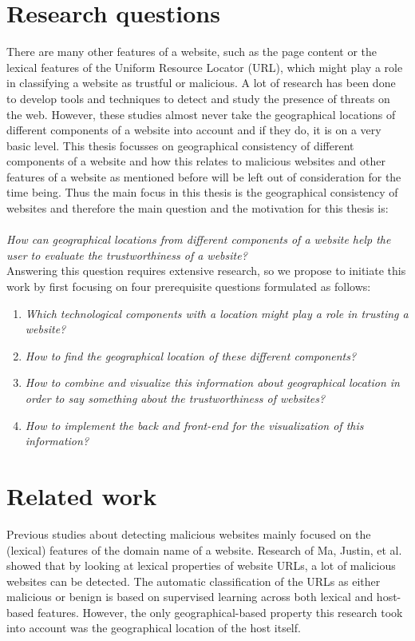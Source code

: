 \documentclass[twoside,openright,notitlepage]{uva-bachelor-thesis}
\begin{document}
\section{Research questions}
There are many other features of a website, such as the page content or the lexical features of the Uniform Resource Locator (URL), which might play a role in classifying a website as trustful or malicious. A lot of research has been done to develop tools and techniques to detect and study the presence of threats on the web. However, these studies almost never take the geographical locations of different components of a website into account and if they do, it is on a very basic level. This thesis focusses on geographical consistency of different components of a website and how this relates to malicious websites and other features of a website as mentioned before will be left out of consideration for the time being. Thus the main focus in this thesis is the geographical consistency of websites and therefore the main question and the motivation for this thesis is:\\\\
\emph{How can geographical locations from different components of a website help the user to evaluate the trustworthiness of a website?}\\

Answering this question requires extensive research, so we propose to initiate this work by first focusing on four prerequisite questions formulated as follows:
\begin{enumerate}
  \item \emph{Which technological components with a location might play a role in trusting a website?}
  \item \emph{How to find the geographical location of these different components?}
  \item \emph{How to combine and visualize this information about geographical location in order to say something about the trustworthiness of websites?}
  \item \emph{How to implement the back and front-end for the visualization of this information?}
\end{enumerate}

\section{Related work}
Previous studies about detecting malicious websites mainly focused on the (lexical) features of the domain name of a website. Research of Ma, Justin, et al.~\cite{ma2009beyond} showed that by looking at lexical properties of website URLs, a lot of malicious websites can be detected. The automatic classification of the URLs as either malicious or benign is based on supervised learning across both lexical and host-based features. However, the only geographical-based property this research took into account was the geographical location of the host itself. \\
\end{document}
